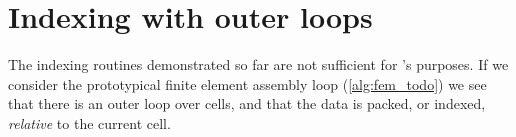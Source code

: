 \documentclass[thesis]{subfiles}
\begin{document}
\section{Indexing with outer loops}
\label{sec:outer_loops}

The indexing routines demonstrated so far are not sufficient for 's purposes.
If we consider the prototypical finite element assembly loop (\cref{alg:fem_todo}) we see that there is an outer loop over cells, and that the data is packed, or indexed, \textit{relative} to the current cell.




\end{document}
